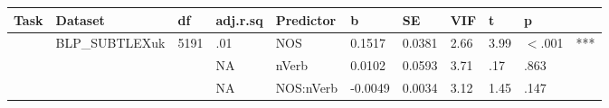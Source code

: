 \begin{table}[ht]
\centering
\begingroup\normalsize
\begin{tabular}{lllllllllll}
  \hline
Task & Dataset & df & adj.r.sq & Predictor & b & SE & VIF & t & p &  \\ 
  \hline
 & BLP\_SUBTLEXuk & 5191 & .01 & NOS & 0.1517 & 0.0381 & 2.66 & 3.99 & $<$.001 & *** \\ 
   &  &  & NA & nVerb & 0.0102 & 0.0593 & 3.71 & .17 & .863 &   \\ 
   &  &  & NA & NOS:nVerb & -0.0049 & 0.0034 & 3.12 & 1.45 & .147 &   \\ 
   \hline
\end{tabular}
\endgroup
\end{table}
